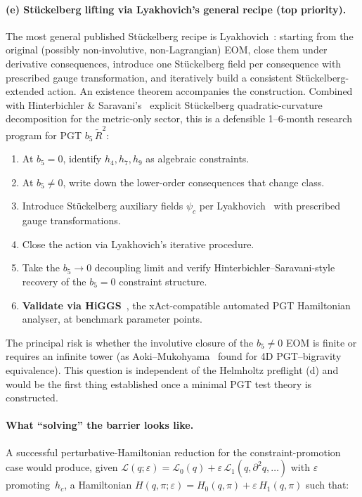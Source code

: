\paragraph{(e) Stückelberg lifting via Lyakhovich's general recipe (top priority).}
The most general published Stückelberg recipe is
Lyakhovich~\cite{Lyakhovich2021}: starting from the original (possibly
non-involutive, non-Lagrangian) EOM, close them under derivative
consequences, introduce one Stückelberg field per consequence with
prescribed gauge transformation, and iteratively build a consistent
Stückelberg-extended action.  An existence theorem accompanies the
construction.  Combined with Hinterbichler \&
Saravani's~\cite{HinterbichlerSaravani2015} explicit Stückelberg
quadratic-curvature decomposition for the metric-only sector, this is a
defensible 1--6-month research program for PGT $b_5\,\tilde{R}^2$:
\begin{enumerate}
  \item At $b_5 = 0$, identify $h_4, h_7, h_9$ as algebraic constraints.
  \item At $b_5 \ne 0$, write down the lower-order consequences that
        change class.
  \item Introduce Stückelberg auxiliary fields $\psi_c$ per
        Lyakhovich~\cite[\S 3]{Lyakhovich2021} with prescribed gauge
        transformations.
  \item Close the action via Lyakhovich's iterative procedure.
  \item Take the $b_5 \to 0$ decoupling limit and verify
        Hinterbichler--Saravani-style recovery of the $b_5 = 0$
        constraint structure.
  \item \textbf{Validate via
        HiGGS}~\cite{Barker:2022kdk,barker2024poincare}, the
        xAct-compatible automated PGT Hamiltonian analyser, at
        benchmark parameter points.
\end{enumerate}
The principal risk is whether the involutive closure of the
$b_5 \ne 0$ EOM is finite or requires an infinite tower (as
Aoki--Mukohyama~\cite{aoki2020ghostfree} found for 4D
PGT--bigravity equivalence).  This question is independent of the
Helmholtz preflight (d) and would be the first thing established once a
minimal PGT test theory is constructed.

\paragraph{What ``solving'' the barrier looks like.}
A successful perturbative-Hamiltonian reduction for the constraint-promotion
case would produce, given $\mathcal{L}(q; \varepsilon) = \mathcal{L}_0(q) +
\varepsilon\, \mathcal{L}_1(q, \partial^2 q, \dots)$ with $\varepsilon$
promoting~$h_c$, a Hamiltonian
$H(q, \pi; \varepsilon) = H_0(q, \pi) + \varepsilon\, H_1(q, \pi)$ such
that:

